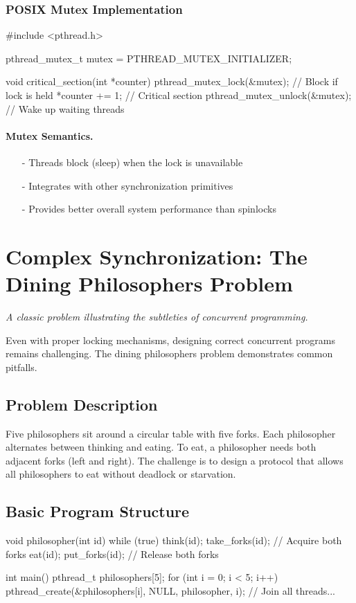 \documentclass[../../compsys.tex]{subfiles}
\begin{document}
\subsubsection{POSIX Mutex Implementation}
\begin{cc}
#include <pthread.h>

pthread_mutex_t mutex = PTHREAD_MUTEX_INITIALIZER;

void critical_section(int *counter) {
    pthread_mutex_lock(&mutex);      // Block if lock is held
    *counter += 1;                   // Critical section
    pthread_mutex_unlock(&mutex);    // Wake up waiting threads
}
\end{cc}

\paragraph{Mutex Semantics.}
\begin{itemize}
  \item[-] Threads block (sleep) when the lock is unavailable
  \item[-] Integrates with other synchronization primitives
  \item[-] Provides better overall system performance than spinlocks
\end{itemize}
\newpage
\section{Complex Synchronization: The Dining Philosophers Problem}
\textit{A classic problem illustrating the subtleties of concurrent programming.}

Even with proper locking mechanisms, designing correct concurrent programs remains challenging. The dining philosophers problem demonstrates common pitfalls.

\subsection{Problem Description}
Five philosophers sit around a circular table with five forks. Each philosopher alternates between thinking and eating. To eat, a philosopher needs both adjacent forks (left and right). The challenge is to design a protocol that allows all philosophers to eat without deadlock or starvation.

\subsection{Basic Program Structure}
\begin{cc}
void philosopher(int id) {
    while (true) {
        think(id);
        take_forks(id);      // Acquire both forks
        eat(id);
        put_forks(id);       // Release both forks
    }
}

int main() {
    pthread_t philosophers[5];
    for (int i = 0; i < 5; i++) {
        pthread_create(&philosophers[i], NULL, philosopher, i);
    }
    // Join all threads...
}
\end{cc}
\end{document}
